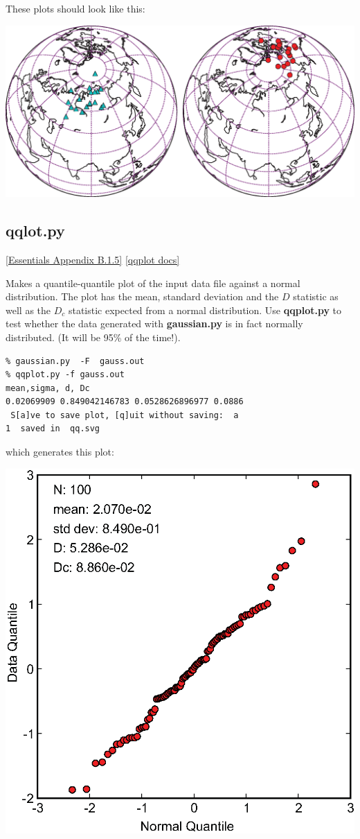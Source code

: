 \documentclass[11pt]{book}
\begin{document}
{{{These plots should look like this:

\includegraphics[width=15cm]{EPSfiles/pt_rot_panA.eps}

\subsection{qqlot.py} \href{http://magician.ucsd.edu/Essentials_2/WebBook2ap2.html#quantile_quantile_plots}{[Essentials Appendix B.1.5]}
\href{http://earthref.org/PmagPy/pmagpydocs/qqplot-module.html}{[qqplot docs]}


Makes a quantile-quantile plot  of the input data file against a normal distribution.  
The plot has the mean, standard deviation and the $D$ statistic as well as the $D_c$ statistic expected from 
a normal distribution.  Use {\bf qqplot.py} to test whether the data generated with {\bf gaussian.py} is in fact normally distributed.
(It will be 95\% of the time!).  

\begin{verbatim}
% gaussian.py  -F  gauss.out
% qqplot.py -f gauss.out
mean,sigma, d, Dc
0.02069909 0.849042146783 0.0528626896977 0.0886
 S[a]ve to save plot, [q]uit without saving:  a
1  saved in  qq.svg
\end{verbatim}

\noindent which generates this plot:

{%
\includegraphics[width=12 cm]{EPSfiles/qq.eps}}

}}}
\end{document}
